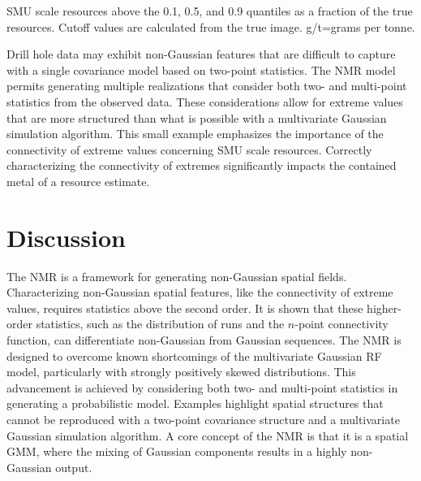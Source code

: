 \begin{table}[!htb]
    \centering
    \caption{\Gls{SMU} scale resources above the 0.1, 0.5, and 0.9 quantiles as a fraction of the true resources. Cutoff values are calculated from the true image. g/t=grams per tonne.}
    \resizebox{1\width}{!}{}
    \label{tab:lightning_resources}
\end{table}

Drill hole data may exhibit non-Gaussian features that are difficult to capture with a single covariance model based on two-point statistics. The \gls{NMR} model permits generating multiple realizations that consider both two- and multi-point statistics from the observed data. These considerations allow for extreme values that are more structured than what is possible with a multivariate Gaussian simulation algorithm. This small example emphasizes the importance of the connectivity of extreme values concerning \gls{SMU} scale resources. Correctly characterizing the connectivity of extremes significantly impacts the contained metal of a resource estimate.

\FloatBarrier
\section{Discussion}
\label{sec:03discuss}

The \gls{NMR} is a framework for generating non-Gaussian spatial fields. Characterizing non-Gaussian spatial features, like the connectivity of extreme values, requires statistics above the second order. It is shown that these higher-order statistics, such as the distribution of runs and the $n$-point connectivity function, can differentiate non-Gaussian from Gaussian sequences. The \gls{NMR} is designed to overcome known shortcomings of the multivariate Gaussian \gls{RF} model, particularly with strongly positively skewed distributions. This advancement is achieved by considering both two- and multi-point statistics in generating a probabilistic model. Examples highlight spatial structures that cannot be reproduced with a two-point covariance structure and a multivariate Gaussian simulation algorithm. A core concept of the \gls{NMR} is that it is a spatial \gls{GMM}, where the mixing of Gaussian components results in a highly non-Gaussian output.

